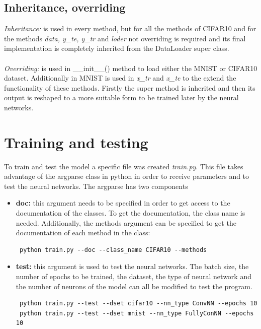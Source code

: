 \documentclass[11pt]{article}
\begin{document}
\subsection{Inheritance, overriding}
\emph{Inheritance:} is used in every method, but  for all the methods of CIFAR10 and for the methods  \emph{data, y\_te, y\_tr} and \emph{loder} not overriding is required and its final implementation is completely inherited from the DataLoader super class.
\\
\\
\emph{Overriding:}  is used in \_\_init\_\_() method to load either the MNIST or CIFAR10 dataset. Additionally in MNIST is used in \emph {x\_tr} and \emph{x\_te} to the extend the functionality of these methods. Firstly the super method is inherited and then its output is reshaped to a more suitable form to be trained later by the neural networks.
\section{Training and testing}
To train and test the model a specific file was created \emph{train.py}. This file takes advantage of the argparse class in python in order to receive parameters and to test the neural networks.
The argparse has two components
\begin{itemize}
\item \textbf{doc:} this argument needs to be specified in order to get access to the documentation of the classes. To get the documentation, the class name is needed. Additionally, the methods argument can be specified to get the documentation of each method in the class:
\begin{lstlisting}
 python train.py --doc --class_name CIFAR10 --methods
\end{lstlisting}

\item \textbf{test:} this argument is used to test the neural networks. The batch size, the number of epochs to be trained, the dataset, the type of neural network and the number of neurons of the model can all be modified to test the program.
\begin{lstlisting}
 python train.py --test --dset cifar10 --nn_type ConvNN --epochs 10
 python train.py --test --dset mnist --nn_type FullyConNN --epochs 10
\end{lstlisting}
\end{itemize}
\end{document}
